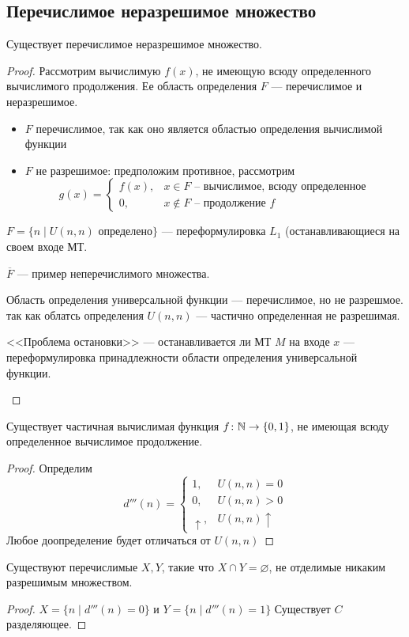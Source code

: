 \subsection{Перечислимое неразрешимое множество}
\begin{thm}
    Существует перечислимое неразрешимое множество.
\end{thm}
\begin{proof}
	Рассмотрим вычислимую $ f(x)$, не имеющую всюду определенного вычислимого продолжения. Ее область определения $ F$ --- перечислимое и неразрешимое.
	\begin{itemize}
		\item $ F$ перечислимое, так как оно является областью определения вычислимой функции
		\item $ F$ не разрешимое: предположим противное,
			рассмотрим 
			 \[
				 g(x) = \begin{cases}
					 f(x), & x \in F \text{ -- вычислимое, всюду определенное} \\
					 0, & x \notin F \text{ -- продолжение } f
				 \end{cases}
			\] 
	\end{itemize}
\begin{note}
	$ F = \{n \mid U(n, n) \text{ определено}\}$ --- переформулировка $ L_1$ (останавливающиеся на своем входе МТ.
\end{note}
\begin{note}
    $ \overline{F}$ --- пример неперечислимого множества.
\end{note}
\begin{note}
    Область определения универсальной функции --- перечислимое, но не разрешмое. 
	так как облатсь определения $ U(n, n)$ --- частично определенная не разрешимая.
\end{note}
\begin{note}
    <<Проблема остановки>> --- останавливается ли МТ $ M$ на входе $ x$ --- переформулировка принадлежности области определения универсальной функции.
\end{note}
\end{proof}


\begin{thm}
    Существует частичная вычислимая функция $ f\colon  \mathbb{N} \to  \{0, 1\}$, не имеющая всюду определенное вычислимое продолжение.
\end{thm}
\begin{proof}
    Определим
	\[
		d'''(n) = \begin{cases}
		1, & U(n, n) = 0 \\
		0, & U(n, n) > 0 \\
		\uparrow, & U(n, n) \uparrow
	\end{cases}
	\] 
	Любое доопределение будет отличаться от $ U(n, n)$
\end{proof}

\begin{cor}
    Существуют перечислимые $ X, Y$, такие что $ X  \cap Y = \varnothing$, не отделимые никаким разрешимым множеством. 
\end{cor}
\begin{proof}
	$ X = \{ n \mid d'''(n) = 0\}$ и  $ Y = \{n \mid d'''(n) =1 \}$
Существует $ C$ разделяющее.
\end{proof}

